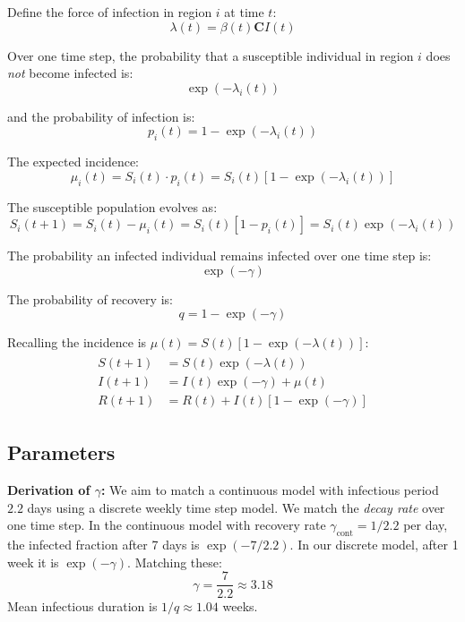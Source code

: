 Define the force of infection in region $i$ at time $t$:
\begin{equation*}
\lambda(t) = \beta(t) \mathbf{C}I(t)
\end{equation*}

Over one time step, the probability that a susceptible individual in
region $i$ does \emph{not} become infected is:
\begin{equation*}
\exp(-\lambda_i(t))
\end{equation*}

and the probability of infection is:
\begin{equation*}
p_i(t) = 1 - \exp(-\lambda_i(t))
\end{equation*}

The expected incidence:
\begin{equation*}
\mu_i(t) = S_i(t) \cdot p_i(t) = S_i(t) \left[1 - \exp(-\lambda_i(t))\right]
\end{equation*}

The susceptible population evolves as:
\begin{equation*}
S_i(t+1) = S_i(t) - \mu_i(t) = S_i(t) [1 - p_i(t)] = S_i(t) \exp(-\lambda_i(t))
\end{equation*}


The probability an infected individual remains infected over one time
step is:
\begin{equation*}
\exp(-\gamma)
\end{equation*}

The probability of recovery is:
\begin{equation*}
q = 1 - \exp(-\gamma)
\end{equation*}

Recalling the incidence is $\mu(t) = S(t) [1 - \exp(-\lambda(t))]$:
\begin{align}\begin{split}\label{eq:exp_sir_compact}
S(t+1) &= S(t) \exp(-\lambda(t)) \\
I(t+1) &= I(t) \exp(-\gamma) + \mu(t) \\
R(t+1) &= R(t) + I(t) [1 - \exp(-\gamma)]
\end{split}\end{align}


\subsection{Parameters}

\textbf{Derivation of $\gamma$:} We aim to match a continuous model
with infectious period $2.2$ days using a discrete weekly time step
model. We match the \emph{decay rate} over one time step. In the continuous
model with recovery rate $\gamma_{\text{cont}} = 1/2.2$ per day, the
infected fraction after 7 days is $\exp(-7/2.2)$. In our discrete
model, after 1 week it is $\exp(-\gamma)$. Matching these:
$$
\gamma = \frac{7}{2.2} \approx 3.18
$$
Mean infectious duration is $1/q \approx 1.04$ weeks.

